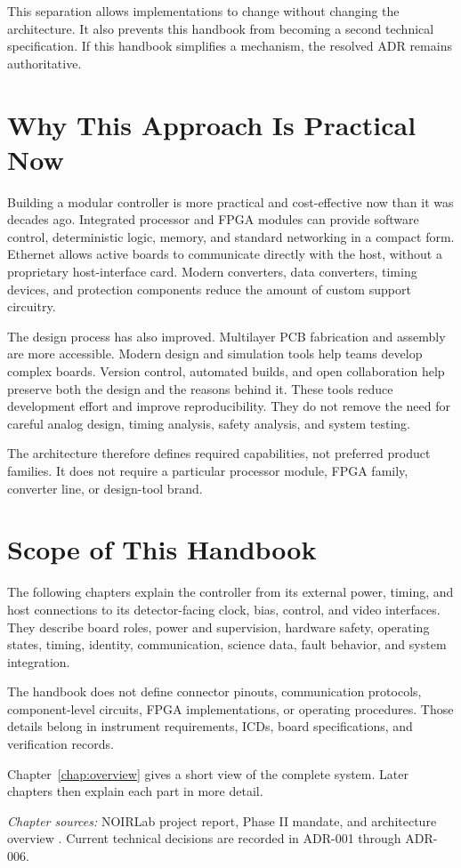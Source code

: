 This separation allows implementations to change without changing the architecture. It also prevents this handbook from becoming a second technical specification. If this handbook simplifies a mechanism, the resolved ADR remains authoritative.

\section{Why This Approach Is Practical Now}

Building a modular controller is more practical and cost-effective now than it was decades ago. Integrated processor and FPGA modules can provide software control, deterministic logic, memory, and standard networking in a compact form. Ethernet allows active boards to communicate directly with the host, without a proprietary host-interface card. Modern converters, data converters, timing devices, and protection components reduce the amount of custom support circuitry.

The design process has also improved. Multilayer PCB fabrication and assembly are more accessible. Modern design and simulation tools help teams develop complex boards. Version control, automated builds, and open collaboration help preserve both the design and the reasons behind it. These tools reduce development effort and improve reproducibility. They do not remove the need for careful analog design, timing analysis, safety analysis, and system testing.

The architecture therefore defines required capabilities, not preferred product families. It does not require a particular processor module, FPGA family, converter line, or design-tool brand.

\section{Scope of This Handbook}

The following chapters explain the controller from its external power, timing, and host connections to its detector-facing clock, bias, control, and video interfaces. They describe board roles, power and supervision, hardware safety, operating states, timing, identity, communication, science data, fault behavior, and system integration.

The handbook does not define connector pinouts, communication protocols, component-level circuits, FPGA implementations, or operating procedures. Those details belong in instrument requirements, ICDs, board specifications, and verification records.

Chapter~\ref{chap:overview} gives a short view of the complete system. Later chapters then explain each part in more detail.

\medskip
\noindent\textit{Chapter sources:} NOIRLab project report, Phase II mandate, and architecture overview \autocite{noirlab-project-report-2025,noirlab-mandate-2025,noirlab-architecture-overview-2026}. Current technical decisions are recorded in ADR-001 through ADR-006.
